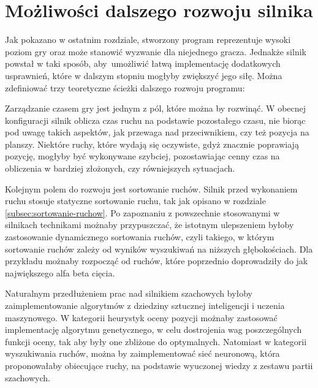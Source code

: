 \section {Możliwości dalszego rozwoju silnika}
\label {sec: dalszy-rozwoj}

Jak pokazano w ostatnim rozdziale, stworzony program reprezentuje wysoki poziom gry oraz może stanowić wyzwanie dla niejednego gracza.
Jednakże silnik powstał w taki sposób, aby~umożliwić łatwą implementację dodatkowych usprawnień, które w dalszym stopniu mogłyby zwiększyć jego siłę.
Można zdefiniować trzy teoretyczne ścieżki dalszego rozwoju programu:

Zarządzanie czasem gry jest jednym z pól, które można by rozwinąć.
W obecnej konfiguracji silnik oblicza czas ruchu na podstawie pozostałego czasu, nie biorąc pod uwagę takich aspektów, jak przewaga nad przeciwnikiem, czy też pozycja na planszy.
Niektóre ruchy, które wydają się oczywiste, gdyż znacznie poprawiają pozycję, mogłyby być wykonywane szybciej, pozostawiając cenny czas na obliczenia w bardziej złożonych, czy równiejszych sytuacjach.

Kolejnym polem do rozwoju jest sortowanie ruchów.
Silnik przed wykonaniem ruchu stosuje statyczne sortowanie ruchu, tak jak opisano w rozdziale \ref {subsec:sortowanie-ruchow}.
Po zapoznaniu z powszechnie stosowanymi w silnikach technikami możnaby przypuszczać, że istotnym ulepszeniem byłoby zastosowanie dynamicznego sortowania ruchów, czyli takiego, w którym sortowanie ruchów zależy od wyników wyszukiwań na niższych głębokościach.
Dla przykładu możnaby rozpocząć od ruchów, które poprzednio doprowadziły do jak największego alfa beta cięcia.

Naturalnym przedłużeniem prac nad silnikiem szachowych byłoby zaimplementowanie algorytmów z dziedziny sztucznej inteligencji i uczenia maszynowego.
W kategorii heurystyk oceny pozycji możnaby zastosować implementację algorytmu genetycznego, w celu dostrojenia wag poszczególnych funkcji oceny, tak aby były one zbliżone do optymalnych.
Natomiast w kategorii wyszukiwania ruchów, można by zaimplementować sieć neuronową, która proponowałaby obiecujące ruchy, na podstawie wyuczonej wiedzy z zestawu partii szachowych.


